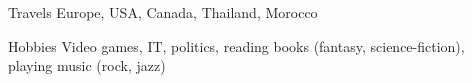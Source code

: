 
\begin{cvskills}

\cvskill
{Travels} %
{Europe, USA, Canada, Thailand, Morocco}


\cvskill
{Hobbies} %
{Video games, IT, politics, reading books (fantasy, science-fiction), playing music (rock, jazz)}

\end{cvskills}

